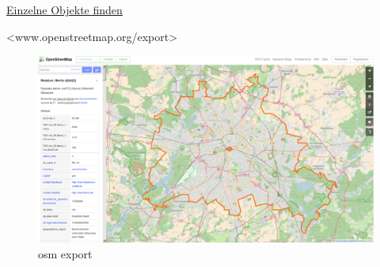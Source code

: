 \documentclass[ignorenonframetext,]{beamer}
\begin{document}
\begin{frame}{\href{http://www.openstreetmap.org/export}{Einzelne
Objekte finden}}
\protect\hypertarget{einzelne-objekte-finden}{}

\textless{}www.openstreetmap.org/export\textgreater{}

\begin{figure}
\centering
\includegraphics{figure/admgrBer.PNG}
\caption{osm export}
\end{figure}

\end{frame}
\end{document}
